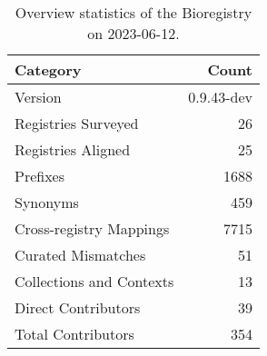 \begin{table}
\caption{Overview statistics of the Bioregistry on 2023-06-12.}
\label{tab:bioregistry-summary}
\begin{tabular}{lr}
\toprule
Category & Count \\
\midrule
Version & 0.9.43-dev \\
Registries Surveyed & 26 \\
Registries Aligned & 25 \\
Prefixes & 1688 \\
Synonyms & 459 \\
Cross-registry Mappings & 7715 \\
Curated Mismatches & 51 \\
Collections and Contexts & 13 \\
Direct Contributors & 39 \\
Total Contributors & 354 \\
\bottomrule
\end{tabular}
\end{table}
